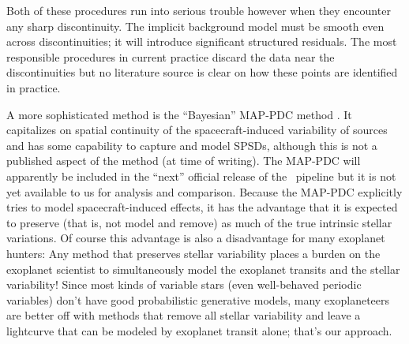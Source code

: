 \documentclass[letterpaper,12pt,preprint]{hack_aastex}
\begin{document}
Both of these procedures run into serious trouble however when they encounter
any sharp discontinuity.
The implicit background model must be smooth even across discontinuities; it
will introduce significant structured residuals.
The most responsible procedures in current practice discard the data
near the discontinuities but no literature source is clear on how these points
are identified in practice.

A more sophisticated method is the ``Bayesian'' MAP-PDC method
\citep{map-pdc1,map-pdc2}.
It capitalizes on spatial
continuity of the spacecraft-induced variability of sources and
has some capability to capture and model SPSDs, although this is not
a published aspect of the method (at time of writing).
The MAP-PDC will apparently be included in the ``next'' official release of the
\Kepler\ pipeline but it is not yet available to us for analysis and comparison.
Because the MAP-PDC explicitly tries to model spacecraft-induced effects, it
has the advantage that it is expected to preserve (that is, not model and
remove) as much of the true intrinsic stellar variations.
Of course this advantage is also a disadvantage for many exoplanet hunters:
Any method that preserves stellar variability places a burden on the exoplanet
scientist to simultaneously model the exoplanet transits and the stellar
variability!
Since most kinds of variable stars (even well-behaved periodic variables)
don't have good probabilistic generative models, many exoplaneteers are better
off with methods that remove all stellar variability and leave a lightcurve
that can be modeled by exoplanet transit alone; that's our approach.
\end{document}
